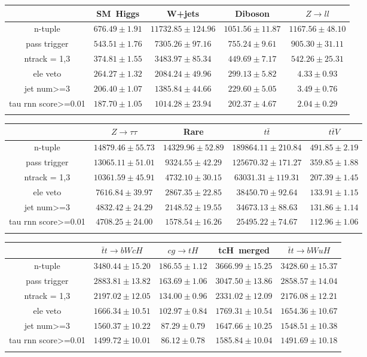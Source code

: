 \centering
\begin{tabular}{ccccc} \toprule\toprule
 & SM~Higgs & W+jets & Diboson & $Z\to ll$\\\midrule
n-tuple & $676.49\pm1.91$ & $11732.85\pm124.96$ & $1051.56\pm11.87$ & $1167.56\pm48.10$\\
pass trigger & $543.51\pm1.76$ & $7305.26\pm97.16$ & $755.24\pm9.61$ & $905.30\pm31.11$\\
ntrack = 1,3 & $374.81\pm1.55$ & $3483.97\pm85.34$ & $449.69\pm7.17$ & $542.26\pm25.31$\\
ele veto & $264.27\pm1.32$ & $2084.24\pm49.96$ & $299.13\pm5.82$ & $4.33\pm0.93$\\
jet num>=3 & $206.40\pm1.07$ & $1385.84\pm44.66$ & $229.60\pm5.05$ & $3.49\pm0.76$\\
tau rnn score>=0.01 & $187.70\pm1.05$ & $1014.28\pm23.94$ & $202.37\pm4.67$ & $2.04\pm0.29$\\
\bottomrule\bottomrule\\
\end{tabular}
\begin{tabular}{ccccc} \toprule\toprule
 & $Z\to \tau\tau$ & Rare & $t\bar{t}$ & $t\bar{t}V$\\\midrule
n-tuple & $14879.46\pm55.73$ & $14329.96\pm52.89$ & $189864.11\pm210.84$ & $491.85\pm2.19$\\
pass trigger & $13065.11\pm51.01$ & $9324.55\pm42.29$ & $125670.32\pm171.27$ & $359.85\pm1.88$\\
ntrack = 1,3 & $10361.59\pm45.91$ & $4732.10\pm30.15$ & $63031.31\pm119.31$ & $207.39\pm1.45$\\
ele veto & $7616.84\pm39.97$ & $2867.35\pm22.85$ & $38450.70\pm92.64$ & $133.91\pm1.15$\\
jet num>=3 & $4832.42\pm24.29$ & $2148.52\pm19.55$ & $34673.13\pm88.63$ & $131.86\pm1.14$\\
tau rnn score>=0.01 & $4708.25\pm24.00$ & $1578.54\pm16.26$ & $25495.22\pm74.67$ & $112.96\pm1.06$\\
\bottomrule\bottomrule\\
\end{tabular}
\begin{tabular}{ccccc} \toprule\toprule
 & $\bar{t}t\to bWcH$ & $cg\to tH$ & tcH~merged & $\bar{t}t\to bWuH$\\\midrule
n-tuple & $3480.44\pm15.20$ & $186.55\pm1.12$ & $3666.99\pm15.25$ & $3428.60\pm15.37$\\
pass trigger & $2883.81\pm13.82$ & $163.69\pm1.06$ & $3047.50\pm13.86$ & $2858.57\pm14.04$\\
ntrack = 1,3 & $2197.02\pm12.05$ & $134.00\pm0.96$ & $2331.02\pm12.09$ & $2176.08\pm12.21$\\
ele veto & $1666.34\pm10.51$ & $102.97\pm0.84$ & $1769.31\pm10.54$ & $1654.36\pm10.67$\\
jet num>=3 & $1560.37\pm10.22$ & $87.29\pm0.79$ & $1647.66\pm10.25$ & $1548.51\pm10.38$\\
tau rnn score>=0.01 & $1499.72\pm10.01$ & $86.12\pm0.78$ & $1585.84\pm10.04$ & $1491.69\pm10.18$\\
\bottomrule\bottomrule\\
\end{tabular}
